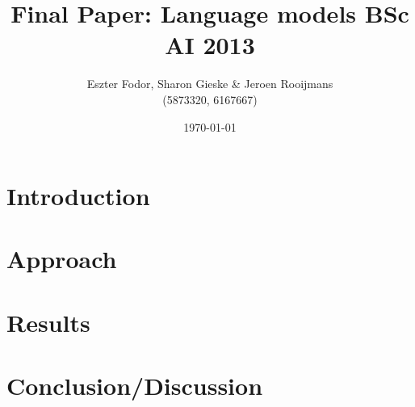 \documentclass[11pt, a4paper]{article}
\title{Final Paper: Language models BSc AI 2013}
\author{Eszter Fodor, Sharon Gieske \& Jeroen Rooijmans \\ (5873320, 6167667)}
\date{\today}
\begin{document}
\maketitle{}


\section*{Introduction}


\section*{Approach}



\section*{Results}


\section*{Conclusion/Discussion}
\end{document}
